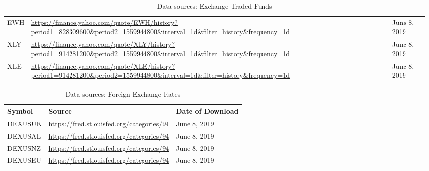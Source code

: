 \documentclass[11pt, a4paper]{article}
\begin{document}
\begin{table}[H]
\begin{tabular}{p{3.0cm} p{10.0cm}l}
        EWH                                                                         & \url{https://finance.yahoo.com/quote/EWH/history?period1=828309600\&period2=1559944800\&interval=1d\&filter=history\&frequency=1d}          & June 8, 2019              \\
        XLY                                                                         & \url{https://finance.yahoo.com/quote/XLY/history?period1=914281200\&period2=1559944800\&interval=1d\&filter=history\&frequency=1d}          & June 8, 2019              \\
        XLE                                                                         & \url{https://finance.yahoo.com/quote/XLE/history?period1=914281200\&period2=1559944800\&interval=1d\&filter=history\&frequency=1d}          & June 8, 2019              \\ \hline
        \end{tabular}
        \caption{Data sources: Exchange Traded Funds}
        \label{tbl:datasets_etfs}
    \end{table}
        
        \begin{table}[H]
    \centering
        \begin{tabular}{p{3.0cm} p{10.0cm}l}
        \hline
        \textbf{Symbol}                                                             & \textbf{Source}                                                                                                                                              & \textbf{Date of Download} \\ \hline
        DEXUSUK                                                                     & \url{https://fred.stlouisfed.org/categories/94}                                                                                             & June 8, 2019              \\
        DEXUSAL                                                                     & \url{https://fred.stlouisfed.org/categories/94}                                                                                             & June 8, 2019              \\
        DEXUSNZ                                                                     & \url{https://fred.stlouisfed.org/categories/94}                                                                                             & June 8, 2019              \\
        DEXUSEU                                                                     & \url{https://fred.stlouisfed.org/categories/94}                                                                                             & June 8, 2019              \\ \hline
       \end{tabular}
        \caption{Data sources: Foreign Exchange Rates}
        \label{tbl:datasets_FX}
    \end{table}
    
\end{document}
